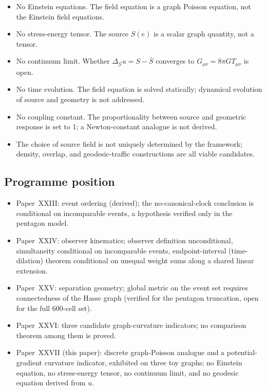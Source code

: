 \documentclass[12pt]{article}
\newcommand{\Gcal}{\mathcal{G}}
\begin{document}
\begin{itemize}
    \item No Einstein equations. The field equation is a graph Poisson equation, not the Einstein field equations.
    \item No stress-energy tensor. The source $S(e)$ is a scalar graph quantity, not a tensor.
    \item No continuum limit. Whether $\Delta_\Gcal u = S - \bar{S}$ converges to $G_{\mu\nu} = 8\pi G T_{\mu\nu}$ is open.
    \item No time evolution. The field equation is solved statically; dynamical evolution of source and geometry is not addressed.
    \item No coupling constant. The proportionality between source and geometric response is set to 1; a Newton-constant analogue is not derived.
    \item The choice of source field is not uniquely determined by the framework; density, overlap, and geodesic-traffic constructions are all viable candidates.
\end{itemize}

\subsection{Programme position}

\begin{itemize}
    \item Paper~XXIII: event ordering (derived); the no-canonical-clock conclusion is conditional on incomparable events, a hypothesis verified only in the pentagon model.
    \item Paper~XXIV: observer kinematics; observer definition unconditional, simultaneity conditional on incomparable events, endpoint-interval (time-dilation) theorem conditional on unequal weight sums along a shared linear extension.
    \item Paper~XXV: separation geometry; global metric on the event set requires connectedness of the Hasse graph (verified for the pentagon truncation, open for the full 600-cell set).
    \item Paper~XXVI: three candidate graph-curvature indicators; no comparison theorem among them is proved.
    \item Paper~XXVII (this paper): discrete graph-Poisson analogue and a potential-gradient curvature indicator, exhibited on three toy graphs; no Einstein equation, no stress-energy tensor, no continuum limit, and no geodesic equation derived from $u$.
\end{itemize}
\end{document}
